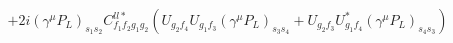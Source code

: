 %
\begin{dmath*}
%
  +  2 i(\gamma^{\mu} P_L)_{s_1 s_2} C^{ll*}_{f_1 f_2 g_1 g_2} \left(U_{g_2 f_4} U_{g_1 f_3} (\gamma^{\mu} P_L)_{s_3 s_4} + U_{g_2 f_3} U_{g_1 f_4}^* (\gamma^{\mu} P_L)_{s_4 s_3}\right)
%
\end{dmath*}
%
